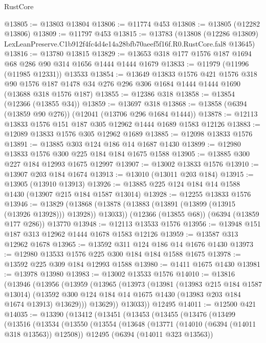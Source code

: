 \begin{lexlean}{RustCore}
\begin{coremodule}
@13805 := @13803 @13804
@13806 := @11774 @453
@13808 := @13805 (@12282 @13806)
@13809 := @11797 @453
@13815 := @13783
    (@13808
      (@12286 @13809)
      LexLeanPreserve.C1b912f4fc4d4e14a28bfb70aeef5f16f.R0.RustCore.fal8
      @13645)
@13816 := @13780 @13815
@13829 := @13653 @318 @177 @1576 @187 @1694 @68 @286 @90 @314 @1656 @1444 @1444 @1679
@13833 := @11979 (@11996 (@11985 @12331)) @13533
@13854 := @13649
    @13833
    @1576
    @421
    @1576
    @318
    @90
    @1576
    @187
    @1478
    @34
    @276
    @296
    @306
    @1684
    @1444
    @1444
    @1690
    (@13688 @318 @1576 @187)
@13855 := @12386 @318
@13858 := @13854 (@12366 (@13855 @34))
@13859 := @13697 @318
@13868 := @13858 (@6394 (@13859 @90 @276)) (@12041 (@13706 @296 @1684 @1444))
@13878 := @12113 @13833 @1576 @151 @187 @305 @12962 @1444 @1689 @1583 @12126
@13883 := @12089 @13833 @1576 @305 @12962 @1689
@13885 := @12098 @13833 @1576
@13891 := @13885 @303 @124 @186 @14 @1687 @1430
@13899 := @12980 @13833 @1576 @300 @225 @184 @184 @1675 @1588
@13905 := @13885 @300 @227 @184 @12993 @1675 @12997
@13907 := @13002 @13833 @1576
@13910 := @13907 @203 @184 @1674
@13913 := @13010 (@13011 @203 @184)
@13915 := @13905 (@13910 @13913)
@13926 := @13885 @225 @124 @184 @14 @1588 @1430 (@13907 @215 @184 @1587 @13014)
@13928 := @12255 @13833 @1576
@13946 := @13829
    (@13868 (@13878 (@13883 (@13891 (@13899 (@13915 (@13926 @13928))) @13928)) @13033))
    (@12366 (@13855 @68))
    (@6394 (@13859 @177 @286))
    @13770
@13948 := @12113 @13533 @1576
@13956 := @13948 @151 @187 @313 @12962 @1444 @1678 @1583 @12126
@13959 := @13587 @313 @12962 @1678
@13965 := @13592 @311 @124 @186 @14 @1676 @1430
@13973 := @12980 @13533 @1576 @225 @300 @184 @184 @1588 @1675
@13978 := @13592 @225 @309 @184 @12993 @1588
@13980 := @1411 @1675 @1430
@13981 := @13978 @13980
@13983 := @13002 @13533 @1576
@14010 := @13816
    (@13946
      (@13956
        (@13959
          (@13965
            (@13973
              (@13981
                (@13983 @215 @184 @1587 @13014)
                (@13592 @300 @124 @184 @14 @1675 @1430 (@13983 @203 @184 @1674 @13913) @13629)))
            @13629))
        @13033))
    @12495
@14011 := @12500 @421
@14035 := @13390
    (@13412
      (@13451
        (@13453
          (@13455
            (@13476
              (@13499
                (@13516
                  (@13534
                    (@13550
                      (@13554
                        (@13648
                          (@13771 (@14010 (@6394 (@14011 @318 @13563)) @12508))
                          @12495
                          (@6394 (@14011 @323 @13563))

\end{coremodule}
\end{lexlean}
